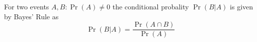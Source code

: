 For two events $A,B : \operatorname{Pr}(A) \neq 0$ the conditional probality $\operatorname{Pr}(B | A)$ is given by Bayes' Rule as
$$\operatorname{Pr}(B | A) = \frac{\operatorname{Pr}(A \cap B)}{\operatorname{Pr}(A)}$$
